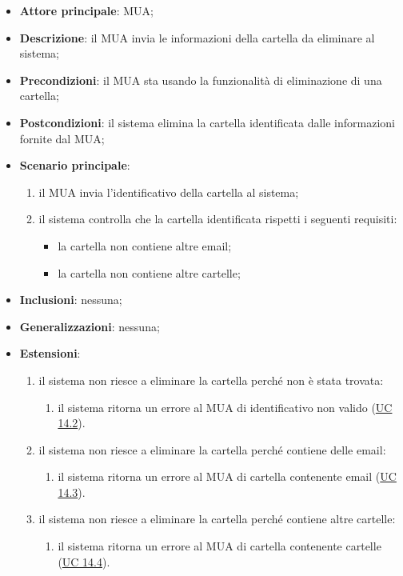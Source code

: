     \begin{itemize}
        \item \textbf{Attore principale}: MUA;
        \item \textbf{Descrizione}: il MUA invia le informazioni della cartella da eliminare al sistema;
        \item \textbf{Precondizioni}: il MUA sta usando la funzionalità di eliminazione di una cartella;
        \item \textbf{Postcondizioni}: il sistema elimina la cartella identificata dalle informazioni fornite dal MUA;
        \item \textbf{Scenario principale}:
            \begin{enumerate}
                \item il MUA invia l'identificativo della cartella al sistema;
                \item il sistema controlla che la cartella identificata rispetti i seguenti requisiti:
                \begin{itemize}
                    \item la cartella non contiene altre email;
                    \item la cartella non contiene altre cartelle;
                \end{itemize}
            \end{enumerate}
        \item \textbf{Inclusioni}: nessuna;
        \item \textbf{Generalizzazioni}: nessuna;
        \item \textbf{Estensioni}:
            \begin{enumerate}[label=\alph*.]
                \item il sistema non riesce a eliminare la cartella perché non è stata trovata:
                \begin{enumerate}[label=\arabic*.]
                    \item il sistema ritorna un errore al MUA di identificativo non valido (\hyperref[sec:UC14.2]{UC 14.2}).
                \end{enumerate}
                \item il sistema non riesce a eliminare la cartella perché contiene delle email:
                \begin{enumerate}[label=\arabic*.]
                    \item il sistema ritorna un errore al MUA di cartella contenente email (\hyperref[sec:UC14.3]{UC 14.3}).
                \end{enumerate}
                \item il sistema non riesce a eliminare la cartella perché contiene altre cartelle:
                \begin{enumerate}[label=\arabic*.]
                    \item il sistema ritorna un errore al MUA di cartella contenente cartelle (\hyperref[sec:UC14.4]{UC 14.4}).
                \end{enumerate}
            \end{enumerate}
    \end{itemize}


